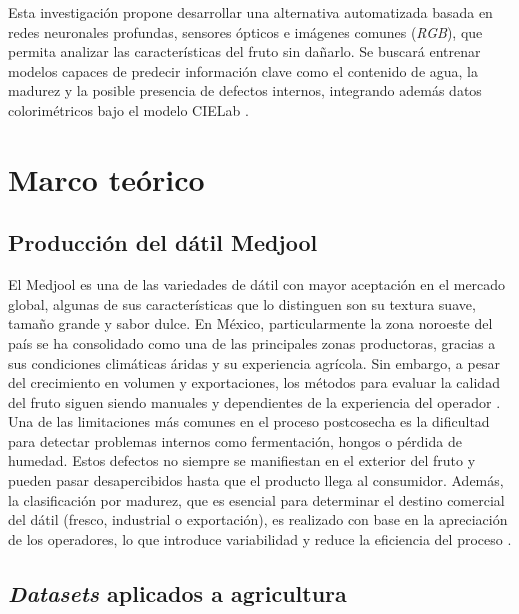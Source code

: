Esta investigación propone desarrollar una alternativa automatizada basada en redes neuronales profundas, sensores ópticos e imágenes comunes (\textit{RGB}), que permita analizar las características del fruto sin dañarlo. Se buscará entrenar modelos capaces de predecir información clave como el contenido de agua, la madurez y la posible presencia de defectos internos, integrando además datos colorimétricos bajo el modelo CIELab \parencite{habib_external_2022}.


\section{Marco teórico}

\subsection{Producción del dátil Medjool}

El Medjool es una de las variedades de dátil con mayor aceptación en el mercado global, algunas de sus características que lo distinguen son su textura suave, tamaño grande y sabor dulce. En México, particularmente la zona noroeste del país se ha consolidado como una de las principales zonas productoras, gracias a sus condiciones climáticas áridas y su experiencia agrícola. Sin embargo, a pesar del crecimiento en volumen y exportaciones, los métodos para evaluar la calidad del fruto siguen siendo manuales y dependientes de la experiencia del operador \parencite{salomon-torres_produccion_2017}.\\

Una de las limitaciones más comunes en el proceso postcosecha es la dificultad para detectar problemas internos como fermentación, hongos o pérdida de humedad. Estos defectos no siempre se manifiestan en el exterior del fruto y pueden pasar desapercibidos hasta que el producto llega al consumidor. Además, la clasificación por madurez, que es esencial para determinar el destino comercial del dátil (fresco, industrial o exportación), es realizado con base en la apreciación de los operadores, lo que introduce variabilidad y reduce la eficiencia del proceso \parencite{perez-perez_evaluation_2021}.

\subsection{\textit{Datasets} aplicados a agricultura}

